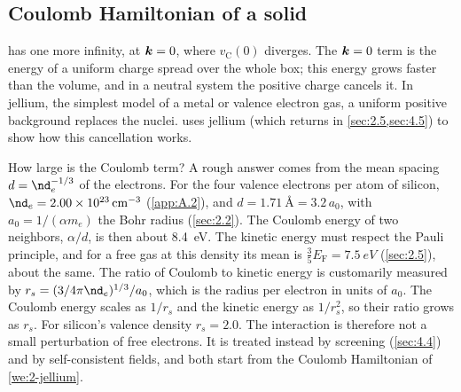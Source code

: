 \subsection{Coulomb Hamiltonian of a solid}

 has one more infinity, at $\bm{k} = 0$, where $v_{\mathrm{C}}(0)$ diverges. The $\bm{k} = 0$ term is the energy of a uniform charge spread over the whole box; this energy grows faster than the volume, and in a neutral system the positive charge cancels it. In jellium, the simplest model of a metal or valence electron gas, a uniform positive background replaces the nuclei.  uses jellium (which returns in \cref{sec:2.5,sec:4.5}) to show how this cancellation works.

How large is the Coulomb term? A rough answer comes from the mean spacing $d = \nd_e^{-1/3}$ of the electrons. For the four valence electrons per atom of silicon, $\nd_e = \SI{2.00e23}{cm^{-3}}$ (\cref{app:A.2}), and $d = \SI{1.71}{\angstrom} = 3.2\,a_0$, with $a_0 = 1/(\alpha m_e)$ the Bohr radius (\cref{sec:2.2}). The Coulomb energy of two neighbors, $\alpha/d$, is then about \SI{8.4}{eV}. The kinetic energy must respect the Pauli principle, and for a free gas at this density its mean is $\tfrac35E_{\mathrm{F}} = \SI{7.5}{eV}$ (\cref{sec:2.5}), about the same. The ratio of Coulomb to kinetic energy is customarily measured by $r_s = (3/4\pi\nd_e)^{1/3}/a_0$, which is the radius per electron in units of $a_0$. The Coulomb energy scales as $1/r_s$ and the kinetic energy as $1/r_s^2$, so their ratio grows as $r_s$. For silicon's valence density $r_s = 2.0$. The interaction is therefore not a small perturbation of free electrons. It is treated instead by screening (\cref{sec:4.4}) and by self-consistent fields, and both start from the Coulomb Hamiltonian of \cref{we:2-jellium}.


